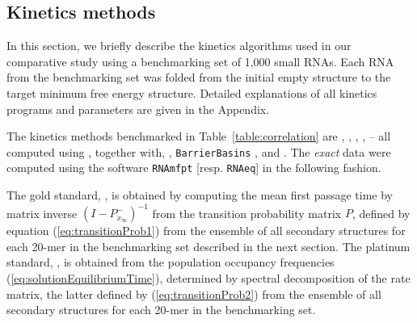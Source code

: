 \subsection{Kinetics methods}

In this section, we briefly describe the kinetics algorithms used in our
comparative study using a benchmarking set of 1,000 small RNAs. Each RNA from
the benchmarking set was folded from the initial empty structure to the
target minimum free energy structure.  Detailed
explanations of all kinetics programs and parameters are given
in the Appendix.

The kinetics methods benchmarked in Table~\ref{table:correlation}
are \rnamfpt,
\rnaeq,
\fftmfpt,
\fftbor,
\ffteq -- all computed using \hermes, together with,
\kinfold \citep{flammHofacker},
{\tt BarrierBasins} \citep{wolfingerStadler:kinetics},
and \rnatwofold \citep{hofacker:RNAbor2D}. The {\em exact} data  were computed using the \hermes software {\tt RNAmfpt}
[resp. {\tt RNAeq}] in the following fashion.

The gold standard, \rnamfpt, is obtained by computing the
mean first passage time by matrix inverse $(I - P^{-}_{x_{\infty}})^{-1}$
from the transition probability matrix $P$, defined by equation
(\ref{eq:transitionProb1}) from the ensemble of all secondary structures
for each 20-mer in the benchmarking set described in the next section.
The platinum standard, \rnaeq, is obtained from the
population occupancy frequencies
(\ref{eq:solutionEquilibriumTime}), determined by spectral decomposition
of the rate matrix, the latter defined by
(\ref{eq:transitionProb2}) from the ensemble of all secondary structures
for each 20-mer in the benchmarking set.

